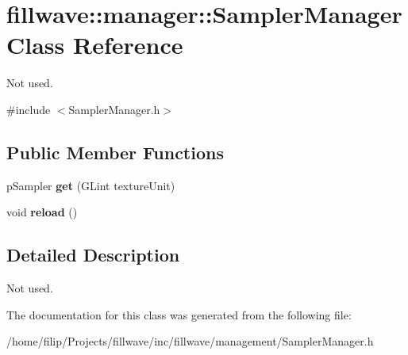 \hypertarget{classfillwave_1_1manager_1_1SamplerManager}{}\section{fillwave\+:\+:manager\+:\+:Sampler\+Manager Class Reference}
\label{classfillwave_1_1manager_1_1SamplerManager}


Not used.  




{\ttfamily \#include $<$Sampler\+Manager.\+h$>$}

\subsection*{Public Member Functions}
\begin{DoxyCompactItemize}
\item 
\hypertarget{classfillwave_1_1manager_1_1SamplerManager_aadf0c099ffe2e2c5a53e6313949ed70e}{}p\+Sampler {\bfseries get} (G\+Lint texture\+Unit)\label{classfillwave_1_1manager_1_1SamplerManager_aadf0c099ffe2e2c5a53e6313949ed70e}

\item 
\hypertarget{classfillwave_1_1manager_1_1SamplerManager_a63e61916405460b47df1e4f3cf5da518}{}void {\bfseries reload} ()\label{classfillwave_1_1manager_1_1SamplerManager_a63e61916405460b47df1e4f3cf5da518}

\end{DoxyCompactItemize}


\subsection{Detailed Description}
Not used. 

The documentation for this class was generated from the following file\+:\begin{DoxyCompactItemize}
\item 
/home/filip/\+Projects/fillwave/inc/fillwave/management/Sampler\+Manager.\+h\end{DoxyCompactItemize}
